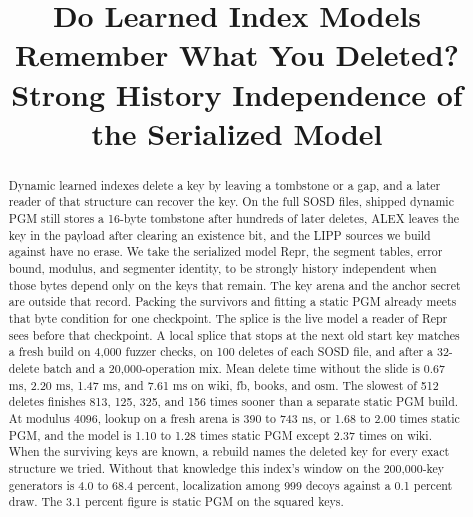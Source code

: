 \documentclass[conference]{IEEEtran}
\begin{document}
\title{Do Learned Index Models Remember What You Deleted? Strong History Independence of the Serialized Model}

\author{
}

\maketitle

\begin{abstract}
Dynamic learned indexes delete a key by leaving a tombstone or a gap, and a later reader of that structure can recover the key.
On the full SOSD files, shipped dynamic PGM still stores a 16-byte tombstone after hundreds of later deletes, ALEX leaves the key in the payload after clearing an existence bit, and the LIPP sources we build against have no erase.
We take the serialized model Repr, the segment tables, error bound, modulus, and segmenter identity, to be strongly history independent when those bytes depend only on the keys that remain. The key arena and the anchor secret are outside that record. Packing the survivors and fitting a static PGM already meets that byte condition for one checkpoint. The splice is the live model a reader of Repr sees before that checkpoint.
A local splice that stops at the next old start key matches a fresh build on 4,000 fuzzer checks, on 100 deletes of each SOSD file, and after a 32-delete batch and a 20,000-operation mix. Mean delete time without the slide is 0.67 ms, 2.20 ms, 1.47 ms, and 7.61 ms on wiki, fb, books, and osm. The slowest of 512 deletes finishes 813, 125, 325, and 156 times sooner than a separate static PGM build. At modulus 4096, lookup on a fresh arena is 390 to 743 ns, or 1.68 to 2.00 times static PGM, and the model is 1.10 to 1.28 times static PGM except 2.37 times on wiki.
When the surviving keys are known, a rebuild names the deleted key for every exact structure we tried. Without that knowledge this index's window on the 200,000-key generators is 4.0 to 68.4 percent, localization among 999 decoys against a 0.1 percent draw. The 3.1 percent figure is static PGM on the squared keys.
\end{abstract}
\end{document}
